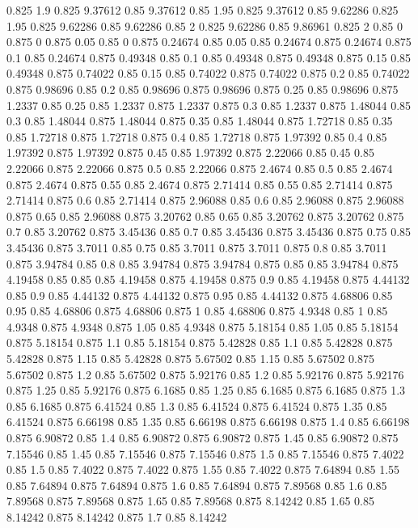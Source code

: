 0.825 1.9
0.825 9.37612
0.85 9.37612
0.85 1.95
0.825 9.37612
0.85 9.62286
0.825 1.95
0.825 9.62286
0.85 9.62286
0.85 2
0.825 9.62286
0.85 9.86961
0.825 2
0.85 0
0.875 0
0.875 0.05
0.85 0
0.875 0.24674
0.85 0.05
0.85 0.24674
0.875 0.24674
0.875 0.1
0.85 0.24674
0.875 0.49348
0.85 0.1
0.85 0.49348
0.875 0.49348
0.875 0.15
0.85 0.49348
0.875 0.74022
0.85 0.15
0.85 0.74022
0.875 0.74022
0.875 0.2
0.85 0.74022
0.875 0.98696
0.85 0.2
0.85 0.98696
0.875 0.98696
0.875 0.25
0.85 0.98696
0.875 1.2337
0.85 0.25
0.85 1.2337
0.875 1.2337
0.875 0.3
0.85 1.2337
0.875 1.48044
0.85 0.3
0.85 1.48044
0.875 1.48044
0.875 0.35
0.85 1.48044
0.875 1.72718
0.85 0.35
0.85 1.72718
0.875 1.72718
0.875 0.4
0.85 1.72718
0.875 1.97392
0.85 0.4
0.85 1.97392
0.875 1.97392
0.875 0.45
0.85 1.97392
0.875 2.22066
0.85 0.45
0.85 2.22066
0.875 2.22066
0.875 0.5
0.85 2.22066
0.875 2.4674
0.85 0.5
0.85 2.4674
0.875 2.4674
0.875 0.55
0.85 2.4674
0.875 2.71414
0.85 0.55
0.85 2.71414
0.875 2.71414
0.875 0.6
0.85 2.71414
0.875 2.96088
0.85 0.6
0.85 2.96088
0.875 2.96088
0.875 0.65
0.85 2.96088
0.875 3.20762
0.85 0.65
0.85 3.20762
0.875 3.20762
0.875 0.7
0.85 3.20762
0.875 3.45436
0.85 0.7
0.85 3.45436
0.875 3.45436
0.875 0.75
0.85 3.45436
0.875 3.7011
0.85 0.75
0.85 3.7011
0.875 3.7011
0.875 0.8
0.85 3.7011
0.875 3.94784
0.85 0.8
0.85 3.94784
0.875 3.94784
0.875 0.85
0.85 3.94784
0.875 4.19458
0.85 0.85
0.85 4.19458
0.875 4.19458
0.875 0.9
0.85 4.19458
0.875 4.44132
0.85 0.9
0.85 4.44132
0.875 4.44132
0.875 0.95
0.85 4.44132
0.875 4.68806
0.85 0.95
0.85 4.68806
0.875 4.68806
0.875 1
0.85 4.68806
0.875 4.9348
0.85 1
0.85 4.9348
0.875 4.9348
0.875 1.05
0.85 4.9348
0.875 5.18154
0.85 1.05
0.85 5.18154
0.875 5.18154
0.875 1.1
0.85 5.18154
0.875 5.42828
0.85 1.1
0.85 5.42828
0.875 5.42828
0.875 1.15
0.85 5.42828
0.875 5.67502
0.85 1.15
0.85 5.67502
0.875 5.67502
0.875 1.2
0.85 5.67502
0.875 5.92176
0.85 1.2
0.85 5.92176
0.875 5.92176
0.875 1.25
0.85 5.92176
0.875 6.1685
0.85 1.25
0.85 6.1685
0.875 6.1685
0.875 1.3
0.85 6.1685
0.875 6.41524
0.85 1.3
0.85 6.41524
0.875 6.41524
0.875 1.35
0.85 6.41524
0.875 6.66198
0.85 1.35
0.85 6.66198
0.875 6.66198
0.875 1.4
0.85 6.66198
0.875 6.90872
0.85 1.4
0.85 6.90872
0.875 6.90872
0.875 1.45
0.85 6.90872
0.875 7.15546
0.85 1.45
0.85 7.15546
0.875 7.15546
0.875 1.5
0.85 7.15546
0.875 7.4022
0.85 1.5
0.85 7.4022
0.875 7.4022
0.875 1.55
0.85 7.4022
0.875 7.64894
0.85 1.55
0.85 7.64894
0.875 7.64894
0.875 1.6
0.85 7.64894
0.875 7.89568
0.85 1.6
0.85 7.89568
0.875 7.89568
0.875 1.65
0.85 7.89568
0.875 8.14242
0.85 1.65
0.85 8.14242
0.875 8.14242
0.875 1.7
0.85 8.14242

